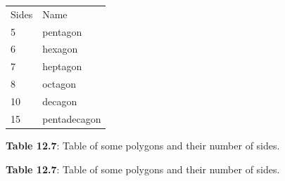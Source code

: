           \begin{table}[H]
        \begin{center}
      \label{m39368*uid92}
    \noindent
      \tablelasttail{}
      \begin{xtabular}[t]{|l|l|}\hline
        Sides &
        Name%
     \tabularnewline{}
        5 &
        pentagon%
     \tabularnewline{}
        6 &
        hexagon%
     \tabularnewline{}
        7 &
        heptagon%
     \tabularnewline{}
        8 &
        octagon%
     \tabularnewline{}
        10 &
        decagon%
     \tabularnewline{}
        15 &
        pentadecagon%
     \tabularnewline{}
    \end{xtabular}
      \end{center}
    \begin{center}{\small\bfseries Table 12.7}: Table of some polygons and their number of sides.\end{center}
    \begin{caption}{\small\bfseries Table 12.7}: Table of some polygons and their number of sides.\end{caption}
\end{table}
    \par
    \setcounter{subfigure}{0}
